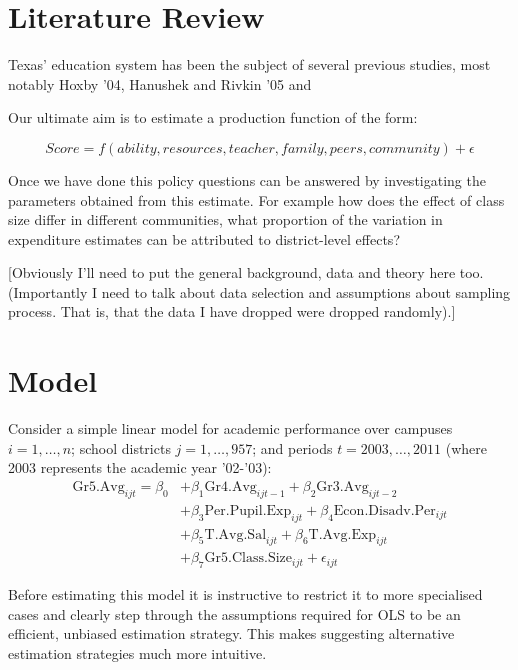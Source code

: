 \documentclass[11pt]{article}
\begin{document}
\section{Literature Review}
\label{s:next}

Texas' education system has been the subject of several previous studies, most notably Hoxby '04, Hanushek and Rivkin '05 and 



Our ultimate aim is to estimate a production function of the form:

$$Score = f(ability,resources,teacher,family,peers,community) + \epsilon$$

Once we have done this policy questions can be answered by investigating the parameters obtained from this estimate. For example how does the effect of class size differ in different communities, what proportion of the variation in expenditure estimates can be attributed to district-level effects?

[Obviously I'll need to put the general background, data and theory here too. (Importantly I need to talk about data selection and assumptions about sampling process. That is, that the data I have dropped were dropped randomly).]

\section{Model}
\label{s:next}


Consider a simple linear model for academic performance over campuses $i=1,\ldots,n$; school districts $j=1,\ldots,957$; and periods $t=2003,\ldots,2011$ (where 2003 represents the academic year '02-'03):
\begin{align*}
\mathrm{Gr5.Avg}_{ijt} = \beta_{0} 
    &+ \beta_{1}  \mathrm{Gr4.Avg}_{ijt-1} 
    + \beta_{2}  \mathrm{Gr3.Avg}_{ijt-2}    \\
    &+ \beta_{3}  \mathrm{Per.Pupil.Exp}_{ijt} 
    + \beta_{4}  \mathrm{Econ.Disadv.Per}_{ijt} \\
    &+ \beta_{5}  \mathrm{T.Avg.Sal}_{ijt}   
    + \beta_{6}  \mathrm{T.Avg.Exp}_{ijt}  \\
    &+ \beta_{7}  \mathrm{Gr5.Class.Size}_{ijt} + \epsilon_{ijt}
\end{align*}


Before estimating this model it is instructive to restrict it to more specialised cases and clearly step through the assumptions required for OLS to be an efficient, unbiased estimation strategy. This makes suggesting alternative estimation strategies much more intuitive.
\end{document}
